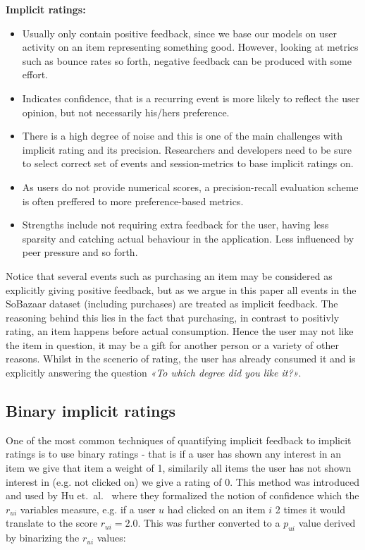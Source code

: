 \textbf{Implicit ratings:}
\begin{itemize}
\item Usually only contain positive feedback, since we base our models on user
activity on an item representing something good. However, looking at metrics
such as bounce rates so forth, negative feedback can be produced with some
effort.
\item Indicates confidence, that is a recurring event is more likely to reflect
the user opinion, but not necessarily his/hers preference.
\item There is a high degree of noise and this is one of the main challenges
with implicit rating and its precision. Researchers and developers need to be
sure to select correct set of events and session-metrics to base implicit
ratings on.
\item As users do not provide numerical scores, a precision-recall evaluation
scheme is often preffered to more preference-based metrics.
\item Strengths include not requiring extra feedback for the user, having less
sparsity and catching actual behaviour in the application. Less influenced by
peer pressure and so forth.
\end{itemize}

Notice that several events such as purchasing an item may be considered as
explicitly giving positive feedback, but as we argue in this paper all events
in the SoBazaar dataset (including purchases) are treated as implicit feedback.
The reasoning behind this lies in the fact that purchasing, in contrast to
positivly rating, an item happens before actual consumption. Hence the user may
not like the item in question, it may be a gift for another person or a variety
of other reasons. Whilst in the scenerio of rating, the user has already
consumed it and is explicitly answering the question \textit{«To which degree
did you like it?»}.

\clearpage
\subsection{Binary implicit ratings}

One of the most common techniques of quantifying implicit feedback to implicit
ratings is to use binary ratings - that is if a user has shown any interest in
an item we give that item a weight of 1, similarily all items the user has not
shown interest in (e.g. not clicked on) we give a rating of 0. This method was
introduced and used by Hu et.\ al.~\cite{Hu2008} where they formalized the
notion of confidence which the $r_{ui}$ variables measure, e.g. if a user $u$
had clicked on an item $i$ 2 times it would translate to the score $r_{ui} =
2.0$. This was further converted to a $p_{ui}$ value derived by binarizing the
$r_{ui}$ values:


